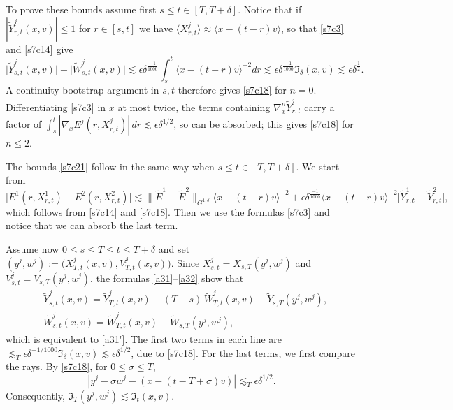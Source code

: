 \documentclass[reqno,11pt]{amsart}
\numberwithin{equation}{section}
\begin{document}
	To prove these bounds assume first $s\leq t\in [T, T+\delta]$. Notice that if 
	$|\widetilde Y^j_{r,t}(x,v)|\leq 1$ for $r\in[s,t]$ we have
	$\langle X^j_{r,t}\rangle\approx\langle x-(t-r)v\rangle$, so that \eqref{s7c3} and \eqref{s7c14} give
	\[
		\bigl|\widetilde Y^j_{s,t}(x,v)\bigr|+\bigl|\widetilde W^j_{s,t}(x,v)\bigr|
		\lesssim\epsilon\delta^{\frac{-1}{1000}}\int_s^t\langle x-(t-r)v\rangle^{-2}dr\lesssim\epsilon\delta^{\frac{-1}{1000}}
		\mathfrak I_\delta(x,v)\lesssim \epsilon\delta^{\frac12}.
	\]
	A continuity bootstrap argument in $s,t$ therefore gives \eqref{s7c18} for
	$n=0$. Differentiating \eqref{s7c3} in $x$ at most twice, the terms containing
	$\nabla_x^n\widetilde Y^j_{r,t}$ carry a factor of
	$\int_s^t|\nabla_xE^j(r,X^j_{r,t})|\,dr\lesssim\epsilon\delta^{1/2}$, so can be absorbed; this gives
	\eqref{s7c18} for $n\leq2$. 
	
	The bounds \eqref{s7c21} follow in the same way when $s\leq t\in [T, T+\delta]$. We start from
	\[
		\bigl|E^1(r,X^1_{r,t})-E^2(r,X^2_{r,t})\bigr|
		\lesssim \|\tilde{E}^1-\tilde{E}^2\|_{G^{1,\delta}}\langle x-(t-r)v\rangle^{-2}
		+\epsilon\delta^{\frac{-1}{1000}}\langle x-(t-r)v\rangle^{-2}\bigl|\widetilde Y^1_{r,t}-\widetilde Y^2_{r,t}\bigr|,
	\]
	which follows from \eqref{s7c14} and \eqref{s7c18}. Then we use the formulas \eqref{s7c3} and notice that we can absorb  the last term.

	Assume now $0\leq s\leq T\leq t\leq T+\delta$ and set
	$(y^j,w^j):=\bigl(X^j_{T,t}(x,v),V^j_{T,t}(x,v)\bigr)$. Since $X^j_{s,t}=X_{s,T}(y^j,w^j)$ and
	$V^j_{s,t}=V_{s,T}(y^j,w^j)$, the formulas \eqref{a31}--\eqref{a32} show that
	\begin{equation}\label{s7c22}
	\begin{split}
		&\widetilde Y^j_{s,t}(x,v)=\widetilde Y^j_{T,t}(x,v)-(T-s)\,\widetilde W^j_{T,t}(x,v)
		+\widetilde Y_{s,T}(y^j,w^j),\\
		&\widetilde W^j_{s,t}(x,v)=\widetilde W^j_{T,t}(x,v)+\widetilde W_{s,T}(y^j,w^j),
	\end{split}
	\end{equation}
	which is equivalent to \eqref{a31'}. The first two terms in each line are
	$\lesssim_T\epsilon\delta^{-1/1000}\mathfrak I_\delta(x,v)\lesssim\epsilon\delta^{1/2}$, due to \eqref{s7c18}. For the last terms, we first compare the rays. By \eqref{s7c18},
for $0\leq\sigma\leq T$,
\[
|y^j-\sigma w^j-(x-(t-T+\sigma)v)|\mathrel{\lesssim_T}\epsilon\delta^{1/2}.
\]
Consequently, $\mathfrak I_T(y^j,w^j)\lesssim\mathfrak I_t(x,v)$. 
\end{document}
